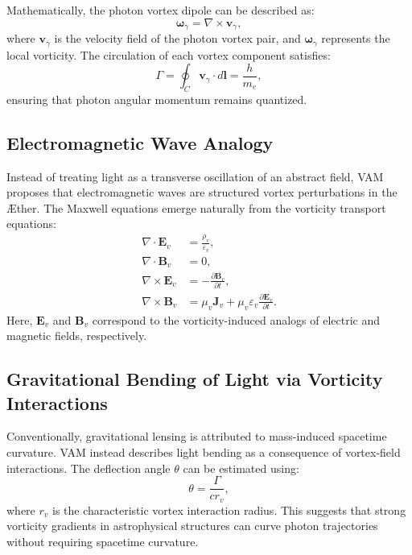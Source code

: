 \documentclass[a4paper,12pt]{article}
\begin{document}
Mathematically, the photon vortex dipole can be described as:
\begin{equation}
    \boldsymbol{\omega}_{\gamma} = \nabla \times \mathbf{v}_{\gamma},
\end{equation}
where $\mathbf{v}_{\gamma}$ is the velocity field of the photon vortex pair, and $\boldsymbol{\omega}_{\gamma}$ represents the local vorticity. The circulation of each vortex component satisfies:
\begin{equation}
    \Gamma = \oint_C \mathbf{v}_{\gamma} \cdot d\mathbf{l} = \frac{h}{m_e},
\end{equation}
ensuring that photon angular momentum remains quantized.

\subsection{Electromagnetic Wave Analogy}
Instead of treating light as a transverse oscillation of an abstract field, VAM proposes that electromagnetic waves are structured vortex perturbations in the Æther. The Maxwell equations emerge naturally from the vorticity transport equations:
\begin{align}
    \nabla \cdot \mathbf{E}_v &= \frac{\rho_v}{\varepsilon_v}, \\
    \nabla \cdot \mathbf{B}_v &= 0, \\
    \nabla \times \mathbf{E}_v &= - \frac{\partial \mathbf{B}_v}{\partial t}, \\
    \nabla \times \mathbf{B}_v &= \mu_v \mathbf{J}_v + \mu_v \varepsilon_v \frac{\partial \mathbf{E}_v}{\partial t}.
\end{align}
Here, $\mathbf{E}_v$ and $\mathbf{B}_v$ correspond to the vorticity-induced analogs of electric and magnetic fields, respectively.

\subsection{Gravitational Bending of Light via Vorticity Interactions}
Conventionally, gravitational lensing is attributed to mass-induced spacetime curvature. VAM instead describes light bending as a consequence of vortex-field interactions. The deflection angle $\theta$ can be estimated using:
\begin{equation}
    \theta = \frac{\Gamma}{c r_v},
\end{equation}
where $r_v$ is the characteristic vortex interaction radius. This suggests that strong vorticity gradients in astrophysical structures can curve photon trajectories without requiring spacetime curvature.
\end{document}

